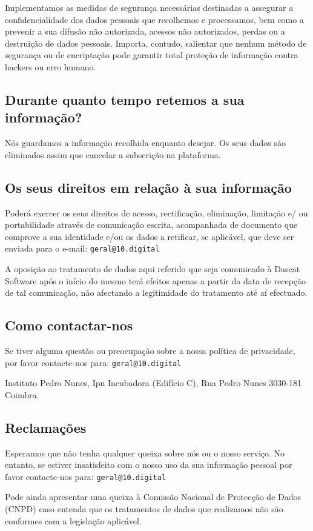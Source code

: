 Implementamos as medidas de segurança necessárias destinadas a assegurar a confidencialidade dos dados pessoais que recolhemos e processamos, bem como a prevenir a sua difusão não autorizada, acessos não autorizados, perdas ou a destruição de dados pessoais. Importa, contudo, salientar que nenhum método de segurança ou de encriptação pode garantir total proteção de informação contra hackers ou erro humano.

\subsection{Durante quanto tempo retemos a sua informação?}

Nós guardamos a informação recolhida enquanto desejar. Os seus dados são eliminados assim que cancelar a subscrição na plataforma. 

\subsection{Os seus direitos em relação à sua informação}

Poderá exercer os seus direitos de acesso, rectificação, eliminação, limitação e/ ou portabilidade através de comunicação escrita, acompanhada de documento que comprove a sua identidade e/ou os dados a retificar, se aplicável, que deve ser enviada para o e-mail: \texttt{geral@10.digital}

A oposição ao tratamento de dados aqui referido que seja comunicado à Dascat Software após o início do mesmo terá efeitos apenas a partir da data de recepção de tal comunicação, não afectando a legitimidade do tratamento até aí efectuado.

\subsection{Como contactar-nos}

Se tiver alguma questão ou preocupação sobre a nossa política de privacidade, por favor contacte-nos para: \texttt{geral@10.digital}

Instituto Pedro Nunes, Ipn Incubadora (Edifício C), Rua Pedro Nunes 
3030-181 Coimbra.

\subsection{Reclamações}

Esperamos que não tenha qualquer queixa sobre nós ou o nosso serviço. No entanto, se estiver insatisfeito com o nosso uso da sua informação pessoal por favor contacte-nos para: \texttt{geral@10.digital}

Pode ainda apresentar uma queixa à Comissão Nacional de Protecção de Dados (CNPD) caso entenda que os tratamentos de dados que realizamos não são conformes com a legislação aplicável.
